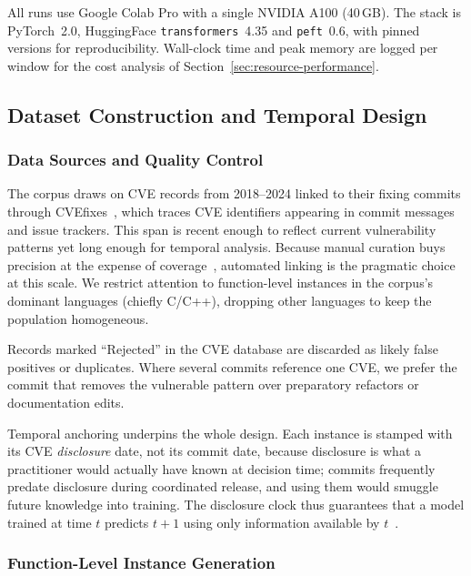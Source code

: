 \documentclass[a4paper,twoside]{article}
\begin{document}
All runs use Google Colab Pro with a single NVIDIA A100 (40\,GB). The stack is PyTorch~2.0, HuggingFace \texttt{transformers}~4.35 and \texttt{peft}~0.6, with pinned versions for reproducibility. Wall-clock time and peak memory are logged per window for the cost analysis of Section~\ref{sec:resource-performance}.

\subsection{Dataset Construction and Temporal Design}
\label{sec:dataset}

\subsubsection{Data Sources and Quality Control}
\label{sec:sources}

\noindent
The corpus draws on CVE records from 2018--2024 linked to their fixing commits through CVEfixes~\citep{Bhandari2021CVEfixes}, which traces CVE identifiers appearing in commit messages and issue trackers. This span is recent enough to reflect current vulnerability patterns yet long enough for temporal analysis. Because manual curation buys precision at the expense of coverage~\citep{Ponta2019Dataset}, automated linking is the pragmatic choice at this scale. We restrict attention to function-level instances in the corpus's dominant languages (chiefly C/C++), dropping other languages to keep the population homogeneous.

Records marked ``Rejected'' in the CVE database are discarded as likely false positives or duplicates. Where several commits reference one CVE, we prefer the commit that removes the vulnerable pattern over preparatory refactors or documentation edits.

Temporal anchoring underpins the whole design. Each instance is stamped with its CVE \emph{disclosure} date, not its commit date, because disclosure is what a practitioner would actually have known at decision time; commits frequently predate disclosure during coordinated release, and using them would smuggle future knowledge into training. The disclosure clock thus guarantees that a model trained at time $t$ predicts $t{+}1$ using only information available by $t$~\citep{Lu2021CodeXGLUE}.

\subsubsection{Function-Level Instance Generation}
\label{sec:instances}
\end{document}

